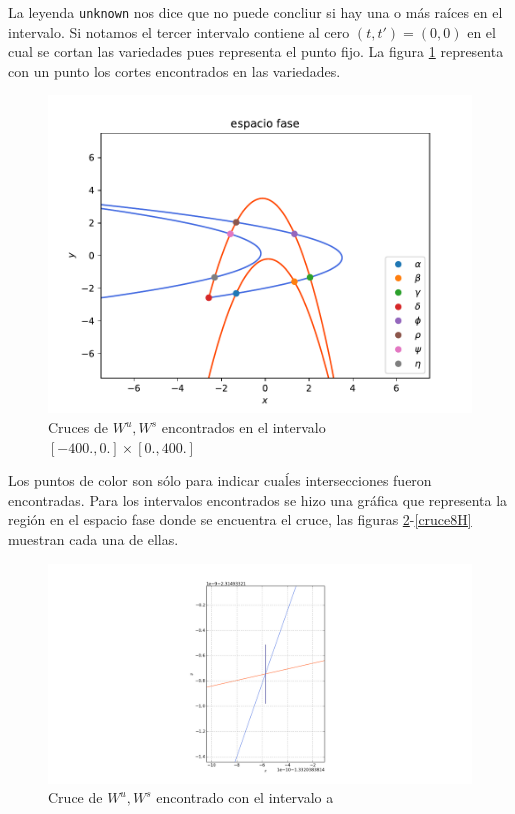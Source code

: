 La leyenda \texttt{unknown} nos dice que no puede concliur si hay una o más raíces en el intervalo. Si notamos el tercer intervalo contiene al cero $(t,t')=(0,0)$ en el cual se cortan las variedades pues representa el punto fijo. La figura \ref{crucesH} representa con un punto los cortes encontrados en las variedades.
\begin{figure}[H]
\centering
\includegraphics[scale=0.5]{crucesL}
\caption{Cruces de $W^{u},W^{s}$ encontrados en el intervalo $[-400.,0.] \times [0.,400.]$ }
\label{crucesH}
\end{figure}
Los puntos de color son sólo para indicar cuaĺes intersecciones fueron encontradas. Para los intervalos encontrados se hizo una gráfica que representa la región en el espacio fase donde se encuentra el cruce, las figuras \ref{cruce1H}-\ref{cruce8H} muestran cada una de ellas.

\begin{figure}[H]
\centering
\includegraphics[scale=0.4]{cruce1}
\caption{Cruce de $W^{u},W^{s}$ encontrado con el intervalo a}
\label{cruce1H}
\end{figure}

